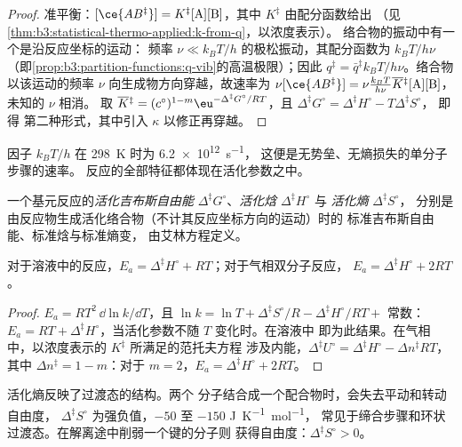 \begin{proof}
准平衡：$[\ce{AB^{\ddagger}}] = K^{\ddagger}[\mathrm A][\mathrm B]$，其中 $K^{\ddagger}$ 由配分函数给出
（见\cref{thm:b3:statistical-thermo-applied:k-from-q}，以浓度表示）。
络合物的振动中有一个是沿反应坐标的运动：
频率 $\nu \ll k_BT/h$ 的极松振动，其配分函数为 $k_BT/h\nu$
（即\cref{prop:b3:partition-functions:q-vib}的高温极限）；因此
$q^{\ddagger} = \bar q^{\ddagger}k_BT/h\nu$。络合物以该运动的频率 $\nu$ 向生成物方向穿越，故速率为
$\nu[\ce{AB^{\ddagger}}] = \nu\frac{k_BT}{h\nu}\overline{K}{}^{\ddagger}[\mathrm A][\mathrm B]$，未知的 $\nu$ 相消。
取 $\overline{K}{}^{\ddagger} = (c^\circ)^{1-m}\eu^{-\Delta^{\ddagger}G^\circ/RT}$，且 $\Delta^{\ddagger}G^\circ = \Delta^{\ddagger}H^\circ - T\Delta^{\ddagger}S^\circ$，
即得
第二种形式，其中引入 $\kappa$ 以修正再穿越。
\end{proof}

因子 $k_BT/h$ 在 \qty{298}{K} 时为 \qty{6.2e12}{s^{-1}}，
这便是无势垒、无熵损失的单分子步骤的速率。
反应的全部特征都体现在活化参数之中。

\begin{definition}\label{def:b3:rate-theories:activation}
一个基元反应的\emph{活化吉布斯自由能}
$\Delta^{\ddagger}G^\circ$、\emph{活化焓} $\Delta^{\ddagger}H^\circ$ 与
\emph{活化熵} $\Delta^{\ddagger}S^\circ$，
分别是由反应物生成活化络合物（不计其反应坐标方向的运动）时的
标准吉布斯自由能、标准焓与标准熵变，
由艾林方程定义。
\end{definition}

\begin{proposition}[活化能与活化焓]\label{prop:b3:rate-theories:ea-dh}
对于溶液中的反应，$E_a = \Delta^{\ddagger}H^\circ + RT$；对于气相双分子反应，
$E_a = \Delta^{\ddagger}H^\circ + 2RT$。
\end{proposition}

\begin{proof}
$E_a = RT^2\,\dd\ln k/\dd T$，且 $\ln k = \ln T + \Delta^{\ddagger}S^\circ/R - \Delta^{\ddagger}H^\circ/RT + $ 常数：$E_a =
RT + \Delta^{\ddagger}H^\circ$，当活化参数不随 $T$ 变化时。在溶液中
即为此结果。在气相中，以浓度表示的 $K^{\ddagger}$ 所满足的范托夫方程
涉及内能，$\Delta^{\ddagger}U^\circ = \Delta^{\ddagger}H^\circ - \Delta n^{\ddagger}RT$，
其中 $\Delta n^{\ddagger} = 1 - m$：对于 $m = 2$，$E_a = \Delta^{\ddagger}H^\circ + 2RT$。
\end{proof}

活化熵反映了过渡态的结构。两个
分子结合成一个配合物时，会失去平动和转动自由度，
$\Delta^{\ddagger}S^\circ$ 为强负值，$-50$ 至 $-150$ \unit{J.K^{-1}.mol^{-1}}，
常见于缔合步骤和环状过渡态。在解离途中削弱一个键的分子则
获得自由度：$\Delta^{\ddagger}S^\circ > 0$。

